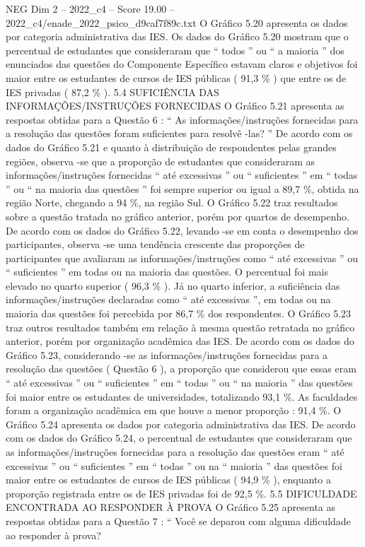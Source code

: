 \begin{textsample}{NEG Dim 2 – 2022\_c4 – Score 19.00 – 2022\_c4/enade\_2022\_psico\_d9caf7f89c.txt}
O Gráfico 5.20 apresenta os dados por categoria administrativa das IES.
Os dados do Gráfico 5.20 mostram que o percentual de estudantes que consideraram que “ todos ” ou “ a maioria ” dos enunciados das questões do Componente Específico estavam claros e objetivos foi maior entre os estudantes de cursos de IES públicas ( 91,3 \% ) que entre os de IES privadas ( 87,2 \% ). 5.4 SUFICIÊNCIA DAS INFORMAÇÕES/INSTRUÇÕES FORNECIDAS O Gráfico 5.21 apresenta as respostas obtidas para a Questão 6 : “ As informações/instruções fornecidas para a resolução das questões foram suficientes para resolvê -las? ” De acordo com os dados do Gráfico 5.21 e quanto à distribuição de respondentes pelas grandes regiões, observa -se que a proporção de estudantes que consideraram as informações/instruções fornecidas “ até excessivas ” ou “ suficientes ” em “ todas ” ou “ na maioria das questões ” foi sempre superior ou igual a 89,7 \%, obtida na região Norte, chegando a 94 \%, na região Sul.
O Gráfico 5.22 traz resultados sobre a questão tratada no gráfico anterior, porém por quartos de desempenho.
De acordo com os dados do Gráfico 5.22, levando -se em conta o desempenho dos participantes, observa -se uma tendência crescente das proporções de participantes que avaliaram as informações/instruções como “ até excessivas ” ou “ suficientes ” em todas ou na maioria das questões.
O percentual foi mais elevado no quarto superior ( 96,3 \% ).
Já no quarto inferior, a suficiência das informações/instruções declaradas como “ até excessivas ”, em todas ou na maioria das questões foi percebida por 86,7 \% dos respondentes.
O Gráfico 5.23 traz outros resultados também em relação à mesma questão retratada no gráfico anterior, porém por organização acadêmica das IES.
De acordo com os dados do Gráfico 5.23, considerando -se as informações/instruções fornecidas para a resolução das questões ( Questão 6 ), a proporção que considerou que essas eram “ até excessivas ” ou “ suficientes ” em “ todas ” ou “ na maioria ” das questões foi maior entre os estudantes de universidades, totalizando 93,1 \%.
As faculdades foram a organização acadêmica em que houve a menor proporção : 91,4 \%.
O Gráfico 5.24 apresenta os dados por categoria administrativa das IES.
De acordo com os dados do Gráfico 5.24, o percentual de estudantes que consideraram que as informações/instruções fornecidas para a resolução das questões eram “ até excessivas ” ou “ suficientes ” em “ todas ” ou na “ maioria ” das questões foi maior entre os estudantes de cursos de IES públicas ( 94,9 \% ), enquanto a proporção registrada entre os de IES privadas foi de 92,5 \%. 5.5 DIFICULDADE ENCONTRADA AO RESPONDER À PROVA O Gráfico 5.25 apresenta as respostas obtidas para a Questão 7 : “ Você se deparou com alguma dificuldade ao responder à prova?

\end{textsample}
